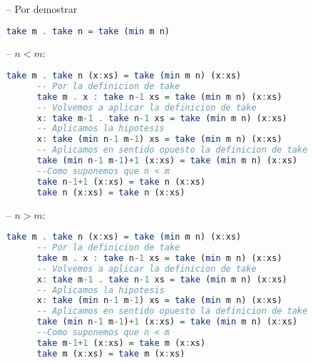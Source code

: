 \documentclass[spanish,12pt,letterpaper]{article}
\begin{document}
\begin{itemize}
\begin{itemize}
      \begin{itemize}
      \item[--] Por demostrar
  	\begin{lstlisting}[language=Haskell]
  	  take m . take n = take (min m n)\end{lstlisting}
      \item[--] $n < m$:
  	\begin{lstlisting}[language=Haskell]
  	  take m . take n (x:xs) = take (min m n) (x:xs)
  	  -- Por la definicion de take
  	  take m . x : take n-1 xs = take (min m n) (x:xs)
  	  -- Volvemos a aplicar la definicion de take
  	  x: take m-1 . take n-1 xs = take (min m n) (x:xs)
  	  -- Aplicamos la hipotesis
  	  x: take (min n-1 m-1) xs = take (min m n) (x:xs)
  	  -- Aplicamos en sentido opuesto la definicion de take
  	  take (min n-1 m-1)+1 (x:xs) = take (min m n) (x:xs)
  	  --Como suponemos que n < m
  	  take n-1+1 (x:xs) = take n (x:xs)
  	  take n (x:xs) = take n (x:xs)\end{lstlisting}
      \item[--] $n > m$:
  	\begin{lstlisting}[language=Haskell]
  	  take m . take n (x:xs) = take (min m n) (x:xs)
  	  -- Por la definicion de take
  	  take m . x : take n-1 xs = take (min m n) (x:xs)
  	  -- Volvemos a aplicar la definicion de take
  	  x: take m-1 . take n-1 xs = take (min m n) (x:xs)
  	  -- Aplicamos la hipotesis
  	  x: take (min n-1 m-1) xs = take (min m n) (x:xs)
  	  -- Aplicamos en sentido opuesto la definicion de take
  	  take (min n-1 m-1)+1 (x:xs) = take (min m n) (x:xs)
  	  --Como suponemos que n < m
  	  take m-1+1 (x:xs) = take m (x:xs)
  	  take m (x:xs) = take m (x:xs)
  	\end{lstlisting}

      \end{itemize}
    \end{itemize}


\end{itemize}
\end{document}
